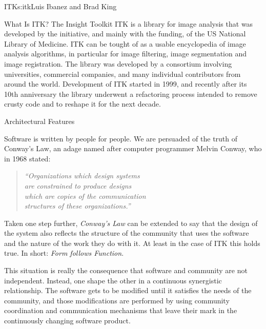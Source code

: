 \begin{aosachapter}{ITK}{s:itk}{Luis Ibanez and Brad King}


\begin{aosasect1}{What Is ITK?}
The Insight Toolkit ITK is a library for image analysis that was developed by
the initiative, and mainly with the funding, of the US National Library of
Medicine. ITK can be tought of as a usable encyclopedia of image analysis
algorithms, in particular for image filtering, image segmentation and image
registration. The library was developed by a consortium involving universities,
commercial companies, and many individual contributors from around the world.
Development of ITK started in 1999, and recently after its 10th anniversary
the library underwent a refactoring process intended to remove crusty code and
to reshape it for the next decade.
\end{aosasect1}

\begin{aosasect1}{Architectural Features}

Software is written by people for people. We are persuaded of the truth of Conway's Law,
an adage named after computer programmer Melvin Conway, who in 1968 stated:

\begin{center}
\begin{quotation}
\emph{
``Organizations which design systems\\
are constrained to produce designs\\
which are copies of the communication\\
structures of these organizations.''
}
\end{quotation}
\end{center}

Taken one step further, \emph{Conway's Law} can be extended to say that the
design of the system also reflects the structure of the community that uses the
software and the nature of the work they do with it. At least in the case of
ITK this holds true. In short: \emph{Form follows Function}.

This situation is really the consequence that software and community are not
independent. Instead, one shape the other in a continuous synergistic
relationship. The software gets to be modified until it satisfies the needs of
the community, and those modifications are performed by using community
coordination and communication mechanisms that leave their mark in the
continuously changing software product.


\end{aosasect1}
\end{aosachapter}
